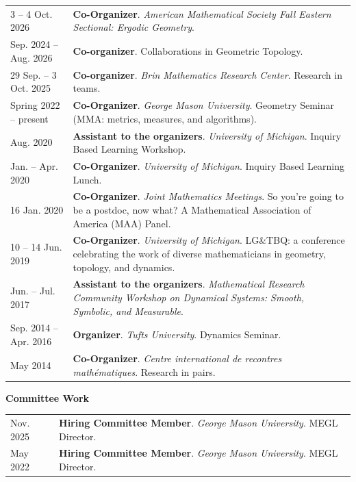     \begin{center}
    {
    \renewcommand{\arraystretch}{1.2}
    \begin{longtable}{p{}  p{}}
    3  -- 4 Oct.  2026 & \textbf{Co-Organizer}. \textit{American Mathematical Society Fall Eastern Sectional: Ergodic Geometry}.  \\ 
 Sep.  2024 --  Aug.  2026 & \textbf{Co-organizer}.  Collaborations in Geometric Topology.  \\ 
29 Sep.  -- 3 Oct.  2025 & \textbf{Co-organizer}. \textit{Brin Mathematics Research Center}.  Research in teams.  \\ 
  Spring 2022 --    present & \textbf{Co-Organizer}. \textit{George Mason University}.  Geometry Seminar (MMA: metrics, measures, and algorithms).  \\ 
 Aug.  2020 & \textbf{Assistant to the organizers}. \textit{University of Michigan}.  Inquiry Based Learning Workshop.  \\ 
 Jan.  --  Apr.  2020 & \textbf{Co-Organizer}. \textit{University of Michigan}.  Inquiry Based Learning Lunch.  \\ 
16 Jan.  2020 & \textbf{Co-Organizer}. \textit{Joint Mathematics Meetings}.  So you're going to be a postdoc, now what? A Mathematical Association of America (MAA) Panel.  \\ 
10  -- 14 Jun.  2019 & \textbf{Co-Organizer}. \textit{University of Michigan}.  LG\&TBQ: a conference celebrating the work of diverse mathematicians
in geometry, topology, and dynamics.  \\ 
 Jun.  --  Jul.  2017 & \textbf{Assistant to the organizers}. \textit{Mathematical Research Community Workshop on Dynamical Systems: Smooth, Symbolic, and Measurable}.  \\ 
 Sep.  2014 --  Apr.  2016 & \textbf{Organizer}. \textit{Tufts University}.  Dynamics Seminar.  \\ 
 May  2014 & \textbf{Co-Organizer}. \textit{Centre international de recontres math\'ematiques}.  Research in pairs.  
    \end{longtable}
    } 
    \end{center}

    \vspace{-1em}
    

    \textbf{\large Committee Work}
    
    \begin{center}
    {
    \renewcommand{\arraystretch}{1.2}
    \begin{longtable}{p{}  p{}}
     Nov.  2025 & \textbf{Hiring Committee Member}. \textit{George Mason University}.  MEGL Director.  \\ 
 May  2022 & \textbf{Hiring Committee Member}. \textit{George Mason University}.  MEGL Director.  
    \end{longtable}
    } 
    \end{center}

